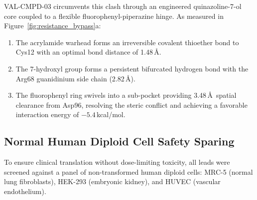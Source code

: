 \documentclass[10pt,journal,compsoc]{IEEEtran}
\begin{document}
VAL-CMPD-03 circumvents this clash through an engineered quinazoline-7-ol core coupled to a flexible fluorophenyl-piperazine hinge. As measured in Figure~\ref{fig:resistance_bypass}a:
\begin{enumerate}
    \item The acrylamide warhead forms an irreversible covalent thioether bond to Cys12 with an optimal bond distance of 1.48\,\AA.
    \item The 7-hydroxyl group forms a persistent bifurcated hydrogen bond with the Arg68 guanidinium side chain (2.82\,\AA).
    \item The fluorophenyl ring swivels into a sub-pocket providing 3.48\,\AA\ spatial clearance from Asp96, resolving the steric conflict and achieving a favorable interaction energy of $-5.4$\,kcal/mol.
\end{enumerate}

\subsection{Normal Human Diploid Cell Safety Sparing}
To ensure clinical translation without dose-limiting toxicity, all leads were screened against a panel of non-transformed human diploid cells: MRC-5 (normal lung fibroblasts), HEK-293 (embryonic kidney), and HUVEC (vascular endothelium).

\begin{table}[t]
\caption{In-Silico Normal Human Cell Cytotoxicity ($\text{CC}_{50}$) vs. On-Target Cancer Efficacy ($\text{IC}_{50}$)}
\label{tab:safety_table}
\centering
{}
\end{table}
\end{document}
